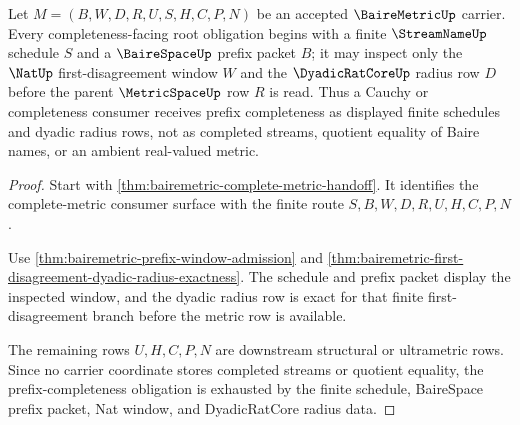 \begin{theorem}
\label{thm:bairemetric-obligation-prefix-completeness}
Let $M=(B,W,D,R,U,S,H,C,P,N)$ be an accepted $\BaireMetricUp$ carrier. Every completeness-facing root obligation begins with a finite $\StreamNameUp$ schedule $S$ and a $\BaireSpaceUp$ prefix packet $B$; it may inspect only the $\NatUp$ first-disagreement window $W$ and the $\DyadicRatCoreUp$ radius row $D$ before the parent $\MetricSpaceUp$ row $R$ is read. Thus a Cauchy or completeness consumer receives prefix completeness as displayed finite schedules and dyadic radius rows, not as completed streams, quotient equality of Baire names, or an ambient real-valued metric.
\end{theorem}
\begin{proof}
Start with \autoref{thm:bairemetric-complete-metric-handoff}. It identifies the complete-metric consumer surface with the finite route $S,B,W,D,R,U,H,C,P,N$.

Use \autoref{thm:bairemetric-prefix-window-admission} and \autoref{thm:bairemetric-first-disagreement-dyadic-radius-exactness}. The schedule and prefix packet display the inspected window, and the dyadic radius row is exact for that finite first-disagreement branch before the metric row is available.

The remaining rows $U,H,C,P,N$ are downstream structural or ultrametric rows. Since no carrier coordinate stores completed streams or quotient equality, the prefix-completeness obligation is exhausted by the finite schedule, BaireSpace prefix packet, Nat window, and DyadicRatCore radius data.
\end{proof}

